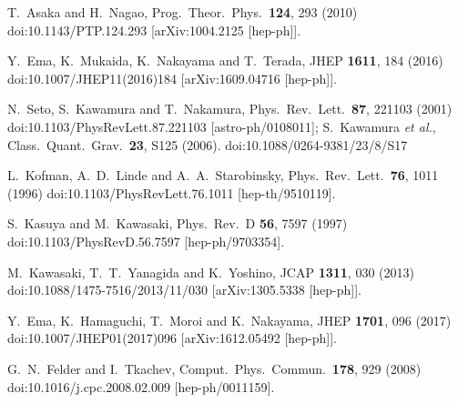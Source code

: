 \documentclass[12pt, a4paper]{article}
\begin{document}
\begin{thebibliography}{99}
  T.~Asaka and H.~Nagao,
  Prog.\ Theor.\ Phys.\  {\bf 124}, 293 (2010)
  doi:10.1143/PTP.124.293
  [arXiv:1004.2125 [hep-ph]].
  
  Y.~Ema, K.~Mukaida, K.~Nakayama and T.~Terada,
  JHEP {\bf 1611}, 184 (2016)
  doi:10.1007/JHEP11(2016)184
  [arXiv:1609.04716 [hep-ph]].
  
  N.~Seto, S.~Kawamura and T.~Nakamura,
  Phys.\ Rev.\ Lett.\ {\bf 87}, 221103 (2001)
  doi:10.1103/PhysRevLett.87.221103
  [astro-ph/0108011];
  S.~Kawamura {\it et al.},
  Class.\ Quant.\ Grav.\ {\bf 23}, S125 (2006).
  doi:10.1088/0264-9381/23/8/S17
    
  L.~Kofman, A.~D.~Linde and A.~A.~Starobinsky,
  Phys.\ Rev.\ Lett.\  {\bf 76}, 1011 (1996)
  doi:10.1103/PhysRevLett.76.1011
  [hep-th/9510119].
  
  S.~Kasuya and M.~Kawasaki,
  Phys.\ Rev.\ D {\bf 56}, 7597 (1997)
  doi:10.1103/PhysRevD.56.7597
  [hep-ph/9703354].
  
  M.~Kawasaki, T.~T.~Yanagida and K.~Yoshino,
  JCAP {\bf 1311}, 030 (2013)
  doi:10.1088/1475-7516/2013/11/030
  [arXiv:1305.5338 [hep-ph]].
  
  Y.~Ema, K.~Hamaguchi, T.~Moroi and K.~Nakayama,
  JHEP {\bf 1701}, 096 (2017)
  doi:10.1007/JHEP01(2017)096
  [arXiv:1612.05492 [hep-ph]].
  
  G.~N.~Felder and I.~Tkachev,
  Comput.\ Phys.\ Commun.\  {\bf 178}, 929 (2008)
  doi:10.1016/j.cpc.2008.02.009
  [hep-ph/0011159].

\end{thebibliography}
\end{document}
